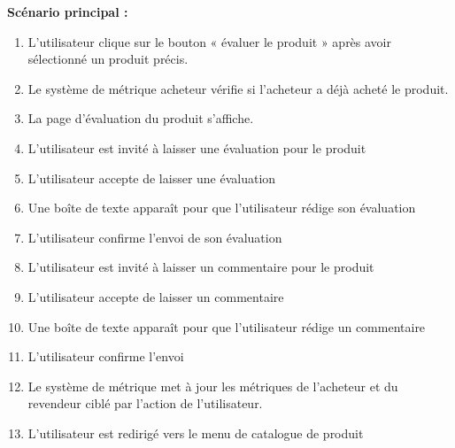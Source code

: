 \documentclass[16pt]{report}
\begin{document}
\textbf{Scénario principal :}
\begin{enumerate}[leftmargin=4em]
        \item L’utilisateur clique sur le bouton « évaluer le produit » après avoir sélectionné un produit précis.
        \item Le système de métrique acheteur vérifie si l’acheteur a déjà acheté le produit.
        \item La page d’évaluation du produit s’affiche.
        \item L’utilisateur est invité à laisser une évaluation pour le produit
        \item L’utilisateur accepte de laisser une évaluation
        \item Une boîte de texte apparaît pour que l’utilisateur rédige son évaluation 
        \item L’utilisateur confirme l’envoi de son évaluation 
        \item L’utilisateur est invité à laisser un commentaire pour le produit
        \item L’utilisateur accepte de laisser un commentaire
        \item Une boîte de texte apparaît pour que l’utilisateur rédige un commentaire
        \item L’utilisateur confirme l’envoi 
        \item Le système de métrique met à jour les métriques de l’acheteur et du revendeur ciblé par l’action de l’utilisateur. 
        \item L’utilisateur est redirigé vers le menu de catalogue de produit

\end{enumerate}
\end{document}
